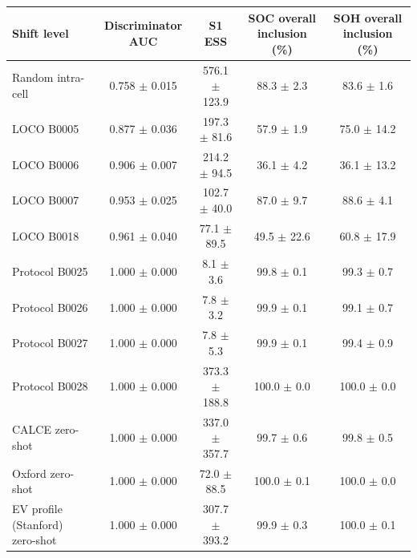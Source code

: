 \begin{tabular}{lcccc}
\toprule
Shift level & Discriminator AUC & S1 ESS & SOC overall inclusion (\%) & SOH overall inclusion (\%) \\
\midrule
Random intra-cell & 0.758 $\pm$ 0.015 & 576.1 $\pm$ 123.9 & 88.3 $\pm$ 2.3 & 83.6 $\pm$ 1.6 \\
LOCO B0005 & 0.877 $\pm$ 0.036 & 197.3 $\pm$ 81.6 & 57.9 $\pm$ 1.9 & 75.0 $\pm$ 14.2 \\
LOCO B0006 & 0.906 $\pm$ 0.007 & 214.2 $\pm$ 94.5 & 36.1 $\pm$ 4.2 & 36.1 $\pm$ 13.2 \\
LOCO B0007 & 0.953 $\pm$ 0.025 & 102.7 $\pm$ 40.0 & 87.0 $\pm$ 9.7 & 88.6 $\pm$ 4.1 \\
LOCO B0018 & 0.961 $\pm$ 0.040 & 77.1 $\pm$ 89.5 & 49.5 $\pm$ 22.6 & 60.8 $\pm$ 17.9 \\
Protocol B0025 & 1.000 $\pm$ 0.000 & 8.1 $\pm$ 3.6 & 99.8 $\pm$ 0.1 & 99.3 $\pm$ 0.7 \\
Protocol B0026 & 1.000 $\pm$ 0.000 & 7.8 $\pm$ 3.2 & 99.9 $\pm$ 0.1 & 99.1 $\pm$ 0.7 \\
Protocol B0027 & 1.000 $\pm$ 0.000 & 7.8 $\pm$ 5.3 & 99.9 $\pm$ 0.1 & 99.4 $\pm$ 0.9 \\
Protocol B0028 & 1.000 $\pm$ 0.000 & 373.3 $\pm$ 188.8 & 100.0 $\pm$ 0.0 & 100.0 $\pm$ 0.0 \\
CALCE zero-shot & 1.000 $\pm$ 0.000 & 337.0 $\pm$ 357.7 & 99.7 $\pm$ 0.6 & 99.8 $\pm$ 0.5 \\
Oxford zero-shot & 1.000 $\pm$ 0.000 & 72.0 $\pm$ 88.5 & 100.0 $\pm$ 0.1 & 100.0 $\pm$ 0.0 \\
EV profile (Stanford) zero-shot & 1.000 $\pm$ 0.000 & 307.7 $\pm$ 393.2 & 99.9 $\pm$ 0.3 & 100.0 $\pm$ 0.1 \\
\bottomrule
\end{tabular}
